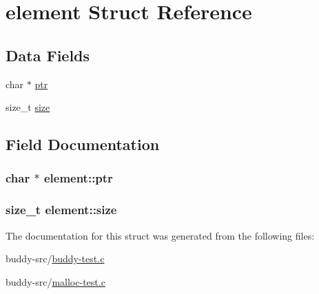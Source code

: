 \hypertarget{structelement}{}\section{element Struct Reference}
\label{structelement}
\subsection*{Data Fields}
\begin{DoxyCompactItemize}
\item 
char $\ast$ \hyperlink{structelement_a132505b73acb9639ab81524dbf845200}{ptr}
\item 
size\+\_\+t \hyperlink{structelement_af5f39eb9d176171d49f822f47906e555}{size}
\end{DoxyCompactItemize}


\subsection{Field Documentation}
\hypertarget{structelement_a132505b73acb9639ab81524dbf845200}{}
\subsubsection[{ptr}]{\setlength{\rightskip}{0pt plus 5cm}char $\ast$ element\+::ptr}\label{structelement_a132505b73acb9639ab81524dbf845200}
\hypertarget{structelement_af5f39eb9d176171d49f822f47906e555}{}
\subsubsection[{size}]{\setlength{\rightskip}{0pt plus 5cm}size\+\_\+t element\+::size}\label{structelement_af5f39eb9d176171d49f822f47906e555}


The documentation for this struct was generated from the following files\+:\begin{DoxyCompactItemize}
\item 
buddy-\/src/\hyperlink{buddy-test_8c}{buddy-\/test.\+c}\item 
buddy-\/src/\hyperlink{malloc-test_8c}{malloc-\/test.\+c}\end{DoxyCompactItemize}
